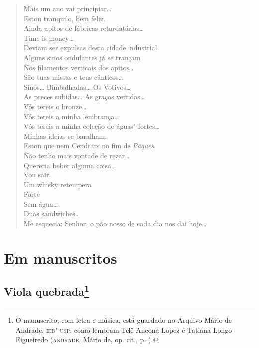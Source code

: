 \begin{verse}
Mais um ano vai principiar\ldots{}\\
Estou tranquilo, bem feliz.\\
Ainda apitos de fábricas retardatárias\ldots{}\\
\qquad\qquad\qquad Time is money\ldots{}\\
\qquad Deviam ser expulsas desta cidade industrial.\\
Alguns sinos ondulantes já se trançam\\
Nos filamentos verticais dos apitos\ldots{}\\
São tuas missas e teus cânticos\ldots{}\\
Sinos\ldots{} Bimbalhadas\ldots{} Os Votivos\ldots{}\\
As preces subidas\ldots{} As graças vertidas\ldots{}\\
Vós tereis o bronze\ldots{}\\
\qquad Vós tereis a minha lembrança\ldots{}\\
\qquad\qquad Vós tereis a minha coleção de águas"-fortes\ldots{}\\
Minhas ideias se baralham.\\
Estou que nem Cendrars no fim de \emph{Pâques}.\\
Não tenho mais vontade de rezar\ldots{}\\
Quereria beber alguma coisa\ldots{}\\
Vou sair.\\
Um whisky retempera\\
\qquad Forte\\
\qquad Sem água\ldots{}\\
Duas sandwiches\ldots{}\\
Me esquecia: Senhor, o pão nosso de cada dia nos dai hoje\ldots{}
\end{verse}

\part{Em manuscritos}

\chapter{Viola quebrada\footnote[*]{O manuscrito, com letra e música, está
  guardado no Arquivo Mário de Andrade, \textsc{ieb"-usp}, como lembram Telê
  Ancona Lopez e Tatiana Longo Figueiredo (\textsc{andrade}, Mário de, op. cit.,
  p. ).}}

